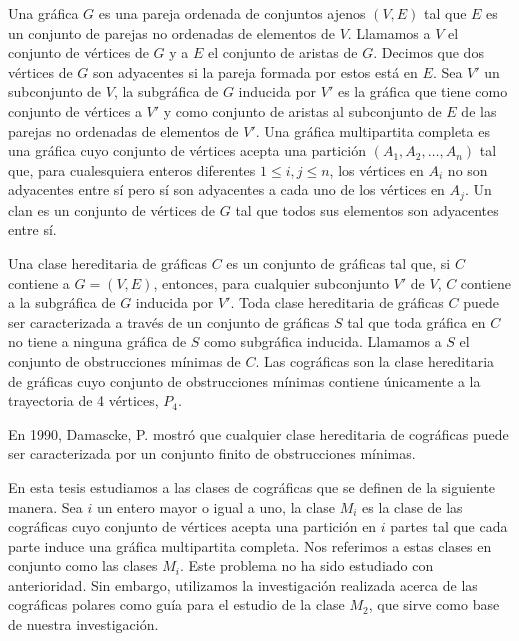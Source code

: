 Una gráfica $G$ es una pareja ordenada de conjuntos ajenos $(V,E)$ tal que $E$ es un conjunto de parejas no ordenadas de elementos de $V$. Llamamos a $V$ el conjunto de vértices de $G$ y a $E$ el conjunto de aristas de $G$. Decimos que dos vértices de $G$ son adyacentes si la pareja formada por estos está en $E$. Sea $V'$ un subconjunto de $V$, la subgráfica de $G$ inducida por $V'$ es la gráfica que tiene como conjunto de vértices a $V'$ y como conjunto de aristas al subconjunto de $E$ de las parejas no ordenadas de elementos de $V'$. Una gráfica multipartita completa es una gráfica cuyo conjunto de vértices acepta una partición $(A_1, A_2,\dots, A_n)$ tal que, para cualesquiera enteros diferentes $1\le i,j \le n$, los vértices en $A_i$ no son adyacentes entre sí pero sí son adyacentes a cada uno de los vértices en $A_j$. Un clan es un conjunto de vértices de $G$ tal que todos sus elementos son adyacentes entre sí.

Una clase hereditaria de gráficas $C$ es un conjunto de gráficas tal que, si $C$ contiene a $G=(V,E)$, entonces, para cualquier subconjunto $V'$ de $V$, $C$ contiene a la subgráfica de $G$ inducida por $V'$. Toda clase hereditaria de gráficas $C$ puede ser caracterizada a través de un conjunto de gráficas $S$ tal que toda gráfica en $C$ no tiene a ninguna gráfica de $S$ como subgráfica inducida. Llamamos a $S$ el conjunto de obstrucciones mínimas de $C$. Las cográficas son la clase hereditaria de gráficas cuyo conjunto de obstrucciones mínimas contiene únicamente a la trayectoria de 4 vértices, $P_4$.

En 1990, Damascke, P. \cite{Damaschke} mostró que cualquier clase hereditaria de cográficas puede ser caracterizada por un conjunto finito de obstrucciones mínimas.

En esta tesis estudiamos a las clases de cográficas que se definen de la siguiente manera. Sea $i$ un entero mayor o igual a uno, la clase $M_i$ es la clase de las cográficas cuyo conjunto de vértices acepta una partición en $i$ partes tal que cada parte induce una gráfica multipartita completa. Nos referimos a estas clases en conjunto como las clases $M_i$. Este problema no ha sido estudiado con anterioridad. Sin embargo, utilizamos la investigación realizada acerca de las cográficas polares como guía para el estudio de la clase $M_2$, que sirve como base de nuestra investigación.

